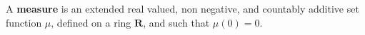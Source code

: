 A \textbf{measure} is an extended real valued, non negative, and countably additive set function $\mu$, defined on a ring $\mathbf{R}$, and such that $\mu(0) = 0$.
